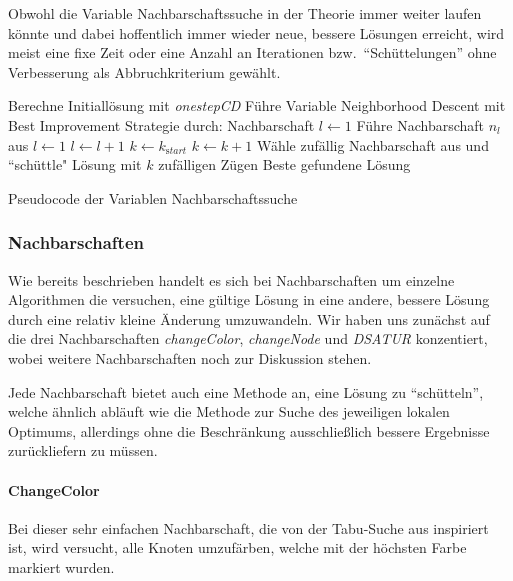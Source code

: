 \documentclass[paper=a4,fontsize=12pt]{scrartcl}
\begin{document}
Obwohl die Variable Nachbarschaftssuche in der Theorie immer weiter laufen könnte und dabei hoffentlich immer wieder neue, bessere Lösungen erreicht, wird meist eine fixe Zeit oder eine Anzahl an Iterationen bzw.\ ``Schüttelungen'' ohne Verbesserung als Abbruchkriterium gewählt.

\begin{algorithm}
\begin{algorithmic}[1]
\State Berechne Initiallösung mit \emph{onestepCD}
\State Führe Variable Neighborhood Descent mit Best Improvement Strategie durch:
\State Nachbarschaft $l \leftarrow 1$
\State Führe Nachbarschaft $n_l$ aus
\State  $l\leftarrow 1$  
\Else
\State  $l\leftarrow l + 1$
\EndIf
\EndWhile
{}
\State $k \leftarrow k_{\mathrm start}$ 
\Else
\State $k \leftarrow k + 1$
\EndIf
\State Wähle zufällig Nachbarschaft aus und ``schüttle" Lösung mit $k$ zufälligen Zügen
\EndWhile
\State\Return Beste gefundene Lösung
\end{algorithmic}
\caption{Pseudocode der Variablen Nachbarschaftssuche}
\end{algorithm}

\subsubsection{Nachbarschaften}
\label{sec:neigh}
Wie bereits beschrieben handelt es sich bei Nachbarschaften um einzelne Algorithmen die versuchen, eine gültige Lösung in eine andere, bessere Lösung durch eine relativ kleine Änderung umzuwandeln. Wir haben uns zunächst auf die drei Nachbarschaften \emph{changeColor}, \emph{changeNode} und \emph{DSATUR} konzentiert, wobei weitere Nachbarschaften noch zur Diskussion stehen.

Jede Nachbarschaft bietet auch eine Methode an, eine Lösung zu ``schütteln'', welche ähnlich abläuft wie die Methode zur Suche des jeweiligen lokalen Optimums, allerdings ohne die Beschränkung ausschließlich bessere Ergebnisse zurückliefern zu müssen.

\paragraph{ChangeColor}
Bei dieser sehr einfachen Nachbarschaft, die von der Tabu-Suche aus \citet*{Noronha2006} inspiriert ist, wird versucht, alle Knoten umzufärben, welche mit der höchsten Farbe markiert wurden. 
\end{document}
